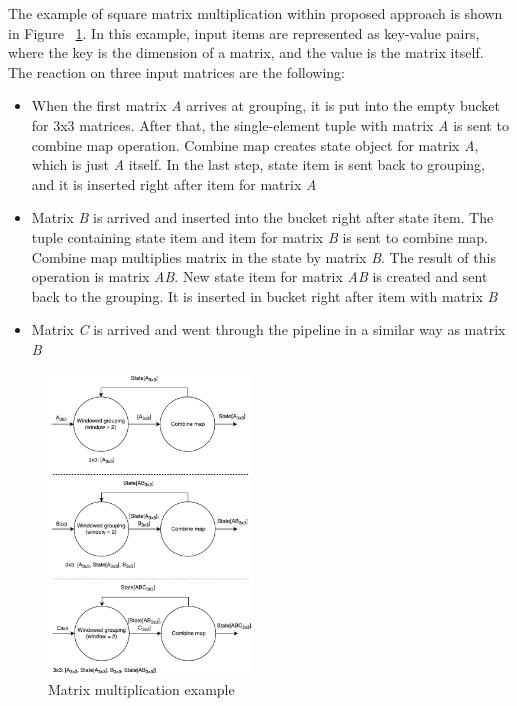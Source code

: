 The example of square matrix multiplication within proposed approach is shown in Figure ~\ref{matrix-example}. In this example, input items are represented as key-value pairs, where the key is the dimension of a matrix, and the value is the matrix itself. The reaction on three input matrices are the following:


\begin{itemize}
    \item When the first matrix {\it A} arrives at grouping, it is put into the empty bucket for 3x3 matrices. After that, the single-element tuple with matrix {\it A} is sent to combine map operation. Combine map creates state object for matrix {\it A}, which is just {\it A} itself. In the last step, state item is sent back to grouping, and it is inserted right after item for matrix {\it A}
    \item Matrix {\it B} is arrived and inserted into the bucket right after state item. The tuple containing state item and item for matrix {\it B} is sent to combine map. Combine map multiplies matrix in the state by matrix {\it B}. The result of this operation is matrix {\it AB}. New state item for matrix {\it AB} is created and sent back to the grouping. It is inserted in bucket right after item with matrix {\it B}
    \item Matrix {\it C} is arrived and went through the pipeline in a similar way as matrix {\it B}
\end{itemize}

\begin{figure}[htbp]
  \centering
  \includegraphics[width=0.48\textwidth]{pics/matrix-example}
  \caption{Matrix multiplication example}
  \label {matrix-example}
\end{figure}

